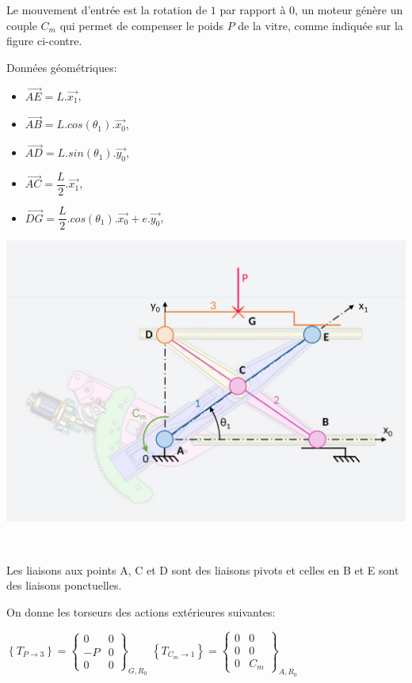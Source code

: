\begin{minipage}{0.38\linewidth}
Le mouvement d'entrée est la rotation de $1$ par rapport à $0$, un moteur génère un couple $C_m$ qui permet de compenser le poids $P$ de la vitre, comme indiquée sur la figure ci-contre.

Données géométriques:
\begin{itemize}
 \item $\overrightarrow{AE}=L.\overrightarrow{x_1}$,
 \item $\overrightarrow{AB}=L.cos(\theta_1).\overrightarrow{x_0}$,
 \item $\overrightarrow{AD}=L.sin(\theta_1).\overrightarrow{y_0}$,
 \item $\overrightarrow{AC}=\dfrac{L}{2}.\overrightarrow{x_1}$,
 \item $\overrightarrow{DG}=\dfrac{L}{2}.cos(\theta_1).\overrightarrow{x_0}+e.\overrightarrow{y_0}$,
\end{itemize}
\end{minipage}
\hfill
\begin{minipage}{0.58\linewidth}
 \centering\includegraphics[width=0.9\linewidth]{img/leve_vitre}
\end{minipage}

~\

Les liaisons aux points A, C et D sont des liaisons pivots et celles en B et E sont des liaisons ponctuelles.

On donne les torseurs des actions extérieures suivantes:\\
\begin{center}
$\left\{T_{P\rightarrow 3}\right\}=\left\{\begin{array}{cc}
0&0\\
-P&0\\
0&0
\end{array}\right\}_{G,R_0}$
$\left\{T_{C_m\rightarrow 1}\right\}=\left\{\begin{array}{cc}
0&0\\
0&0\\
0&C_m
\end{array}\right\}_{A,R_0}$
\end{center}

